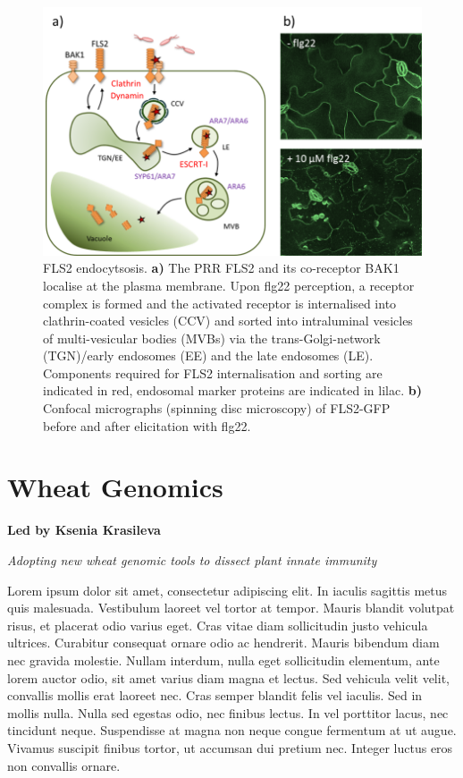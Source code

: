 \documentclass[12pt,]{book}
\begin{document}
\begin{figure}
\includegraphics[width=5.72in]{assets/sr_fig1_prac} \caption{FLS2 endocytsosis. \textbf{a)} The PRR FLS2 and its
co-receptor BAK1 localise at the plasma membrane. Upon flg22 perception,
a receptor complex is formed and the activated receptor is internalised
into clathrin-coated vesicles (CCV) and sorted into intraluminal
vesicles of multi-vesicular bodies (MVBs) via the trans-Golgi-network
(TGN)/early endosomes (EE) and the late endosomes (LE). Components
required for FLS2 internalisation and sorting are indicated in red,
endosomal marker proteins are indicated in lilac. \textbf{b)} Confocal
micrographs (spinning disc microscopy) of FLS2-GFP before and after
elicitation with flg22.}\label{fig:srfig}
\end{figure}

\chapter*{Wheat Genomics}\label{wheat-genomics}

\textbf{Led by Ksenia Krasileva}

\emph{Adopting new wheat genomic tools to dissect plant innate immunity}

Lorem ipsum dolor sit amet, consectetur adipiscing elit. In iaculis
sagittis metus quis malesuada. Vestibulum laoreet vel tortor at tempor.
Mauris blandit volutpat risus, et placerat odio varius eget. Cras vitae
diam sollicitudin justo vehicula ultrices. Curabitur consequat ornare
odio ac hendrerit. Mauris bibendum diam nec gravida molestie. Nullam
interdum, nulla eget sollicitudin elementum, ante lorem auctor odio, sit
amet varius diam magna et lectus. Sed vehicula velit velit, convallis
mollis erat laoreet nec. Cras semper blandit felis vel iaculis. Sed in
mollis nulla. Nulla sed egestas odio, nec finibus lectus. In vel
porttitor lacus, nec tincidunt neque. Suspendisse at magna non neque
congue fermentum at ut augue. Vivamus suscipit finibus tortor, ut
accumsan dui pretium nec. Integer luctus eros non convallis ornare.
\end{document}
